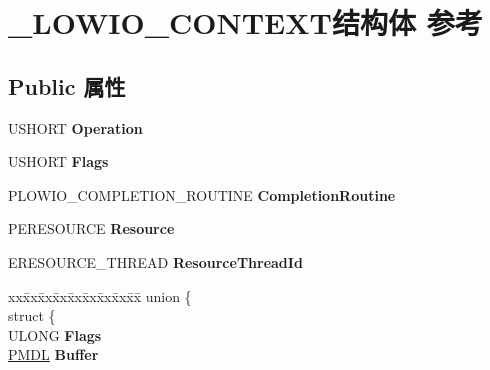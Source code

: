 \hypertarget{struct___l_o_w_i_o___c_o_n_t_e_x_t}{}\section{\+\_\+\+L\+O\+W\+I\+O\+\_\+\+C\+O\+N\+T\+E\+X\+T结构体 参考}
\label{struct___l_o_w_i_o___c_o_n_t_e_x_t}
\subsection*{Public 属性}
\begin{DoxyCompactItemize}
\item 
\mbox{\label{struct___l_o_w_i_o___c_o_n_t_e_x_t_a53fbbd5360f9e9a930cf1f8f2dbeebc9}} 
U\+S\+H\+O\+RT {\bfseries Operation}
\item 
\mbox{\label{struct___l_o_w_i_o___c_o_n_t_e_x_t_a9583c5fb2887ffb903c7fbec424ba45e}} 
U\+S\+H\+O\+RT {\bfseries Flags}
\item 
\mbox{\label{struct___l_o_w_i_o___c_o_n_t_e_x_t_af106b5daec00f1653880476a475941d6}} 
P\+L\+O\+W\+I\+O\+\_\+\+C\+O\+M\+P\+L\+E\+T\+I\+O\+N\+\_\+\+R\+O\+U\+T\+I\+NE {\bfseries Completion\+Routine}
\item 
\mbox{\label{struct___l_o_w_i_o___c_o_n_t_e_x_t_a8dd702cd75919f3a7eadac560dbc200a}} 
P\+E\+R\+E\+S\+O\+U\+R\+CE {\bfseries Resource}
\item 
\mbox{\label{struct___l_o_w_i_o___c_o_n_t_e_x_t_a8a7be8329cd84c37405e86f931c75e3a}} 
E\+R\+E\+S\+O\+U\+R\+C\+E\+\_\+\+T\+H\+R\+E\+AD {\bfseries Resource\+Thread\+Id}
\item 
\mbox{\label{struct___l_o_w_i_o___c_o_n_t_e_x_t_a3766271b0d4c2d22b6eacc3d0a7040e1}} 
\begin{tabbing}
xx\=xx\=xx\=xx\=xx\=xx\=xx\=xx\=xx\=\kill
union \{\\
\>struct \{\\
\>\>ULONG {\bfseries Flags}\\
\>\>\hyperlink{interfacevoid}{PMDL} {\bfseries Buffer}\\

\end{tabbing}
\end{DoxyCompactItemize}

